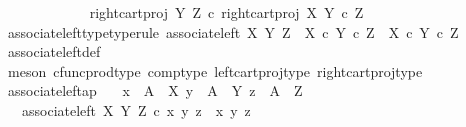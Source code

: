 \begin{isabellebody}
\ \ \ \ \ \ {\isasymrangle}{\isacharcomma}{\kern0pt}\isanewline
\ \ \ \ \ \ right{\isacharunderscore}{\kern0pt}cart{\isacharunderscore}{\kern0pt}proj\ Y\ Z\ {\isasymcirc}\isactrlsub c\ right{\isacharunderscore}{\kern0pt}cart{\isacharunderscore}{\kern0pt}proj\ X\ {\isacharparenleft}{\kern0pt}Y\ {\isasymtimes}\isactrlsub c\ Z{\isacharparenright}{\kern0pt}\isanewline
\ \ \ \ {\isasymrangle}{\isachardoublequoteclose}\isanewline
\isanewline
{}\isamarkupfalse%
\ associate{\isacharunderscore}{\kern0pt}left{\isacharunderscore}{\kern0pt}type{\isacharbrackleft}{\kern0pt}type{\isacharunderscore}{\kern0pt}rule{\isacharbrackright}{\kern0pt}{\isacharcolon}{\kern0pt}\ {\isachardoublequoteopen}associate{\isacharunderscore}{\kern0pt}left\ X\ Y\ Z\ {\isacharcolon}{\kern0pt}\ X\ {\isasymtimes}\isactrlsub c\ {\isacharparenleft}{\kern0pt}Y\ {\isasymtimes}\isactrlsub c\ Z{\isacharparenright}{\kern0pt}\ {\isasymrightarrow}\ {\isacharparenleft}{\kern0pt}X\ {\isasymtimes}\isactrlsub c\ Y{\isacharparenright}{\kern0pt}\ {\isasymtimes}\isactrlsub c\ Z{\isachardoublequoteclose}\isanewline
%
\isadelimproof
\ \ %
\endisadelimproof
%
\isatagproof
{}\isamarkupfalse%
\ associate{\isacharunderscore}{\kern0pt}left{\isacharunderscore}{\kern0pt}def\isanewline
\ \ \isamarkupfalse%
\ {\isacharparenleft}{\kern0pt}meson\ cfunc{\isacharunderscore}{\kern0pt}prod{\isacharunderscore}{\kern0pt}type\ comp{\isacharunderscore}{\kern0pt}type\ left{\isacharunderscore}{\kern0pt}cart{\isacharunderscore}{\kern0pt}proj{\isacharunderscore}{\kern0pt}type\ right{\isacharunderscore}{\kern0pt}cart{\isacharunderscore}{\kern0pt}proj{\isacharunderscore}{\kern0pt}type{\isacharparenright}{\kern0pt}%
\endisatagproof
{\isafoldproof}%
%
\isadelimproof
\isanewline
%
\endisadelimproof
\isanewline
{}\isamarkupfalse%
\ associate{\isacharunderscore}{\kern0pt}left{\isacharunderscore}{\kern0pt}ap{\isacharcolon}{\kern0pt}\isanewline
\ \ \ {\isachardoublequoteopen}x\ {\isacharcolon}{\kern0pt}\ A\ {\isasymrightarrow}\ X{\isachardoublequoteclose}\ {\isachardoublequoteopen}y\ {\isacharcolon}{\kern0pt}\ A\ {\isasymrightarrow}\ Y{\isachardoublequoteclose}\ {\isachardoublequoteopen}z\ {\isacharcolon}{\kern0pt}\ A\ {\isasymrightarrow}\ Z{\isachardoublequoteclose}\isanewline
\ \ \ {\isachardoublequoteopen}associate{\isacharunderscore}{\kern0pt}left\ X\ Y\ Z\ {\isasymcirc}\isactrlsub c\ {\isasymlangle}x{\isacharcomma}{\kern0pt}\ {\isasymlangle}y{\isacharcomma}{\kern0pt}\ z{\isasymrangle}{\isasymrangle}\ {\isacharequal}{\kern0pt}\ {\isasymlangle}{\isasymlangle}x{\isacharcomma}{\kern0pt}\ y{\isasymrangle}{\isacharcomma}{\kern0pt}\ z{\isasymrangle}{\isachardoublequoteclose}\isanewline

\end{isabellebody}
